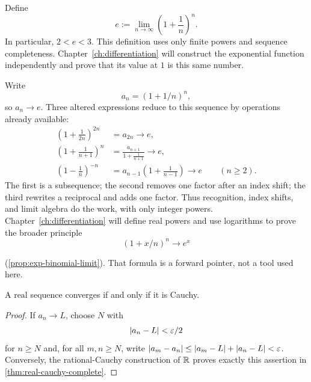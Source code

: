 \begin{definition}
\label{def:e-sequential}
Define
\[
\boxed{
e:=\lim_{n\to\infty}\left(1+\frac1n\right)^n.
}
\]
In particular, \(2<e<3\). This definition uses only finite powers and
sequence completeness. Chapter~\ref{ch:differentiation} will construct the
exponential function independently and prove that its value at \(1\) is
this same number.
\end{definition}

\begin{example}
Write
\[
a_n=(1+1/n)^n,
\]
 so $a_n\to e$. Three altered expressions reduce
to this sequence by operations already available:
\[
\begin{aligned}
\left(1+\frac1{2n}\right)^{2n}&=a_{2n}\longrightarrow e,\\
\left(1+\frac1{n+1}\right)^n
 &=\frac{a_{n+1}}{1+\frac1{n+1}}\longrightarrow e,\\
\left(1-\frac1n\right)^{-n}
 &=a_{n-1}\left(1+\frac1{n-1}\right)\longrightarrow e\qquad(n\geq2).
\end{aligned}
\]
The first is a subsequence; the second removes one factor after an index
shift; the third rewrites a reciprocal and adds one factor. Thus recognition,
index shifts, and limit algebra do the work, with only integer powers.
Chapter~\ref{ch:differentiation} will define real powers and use logarithms
to prove the broader principle
\[
(1+x/n)^n\to e^x
\]

(\cref{prop:exp-binomial-limit}). That formula is a forward pointer, not a
tool used here.
\end{example}

\begin{theorem}
\label{thm:cauchy-criterion}
A real sequence converges if and only if it is Cauchy.
\end{theorem}
\begin{proof}
If $a_n\to L$, choose $N$ with
\[
\lvert a_n-L\rvert<\varepsilon/2
\]
 for $n\geq N$ and, for all $m,n\geq N$, write
$|a_m-a_n|\leq|a_m-L|+|a_n-L|<\varepsilon$. Conversely, the rational-Cauchy construction of $\mathbb{R}$ proves exactly this assertion in \cref{thm:real-cauchy-complete}.
\end{proof}

